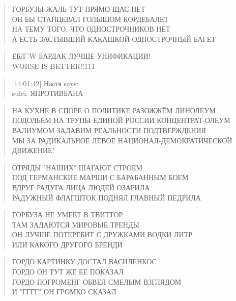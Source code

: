 \poemtitle{***}
\begin{verse}
ГОРБУЗЫ ЖАЛЬ ТУТ ПРЯМО ЩАС НЕТ\\
ОН БЫ СТАНЦЕВАЛ ГОЛЫШОМ КОРДЕБАЛЕТ\\
НА ТЕМУ ТОГО, ЧТО ОДНОСТРОЧНИКОВ НЕТ\\
А ЕСТЬ ЗАСТЫВШИЙ КАКАШКОЙ ОДНОСТРОЧНЫЙ БАГЕТ
\end{verse}

\poemtitle{***}
\begin{verse}
ЕБЛ^W БАРДАК ЛУЧШЕ УНИФИКАЦИИ!\\
WORSE IS BETTER!!111
\end{verse}

\poemtitle{***}
\begin{verse}
[14:01:42] Наcтя says:\\
sulci: ЯПРОТИВБАНА
\end{verse}

\poemtitle{***}
\begin{verse}
НА КУХНЕ В СПОРЕ О ПОЛИТИКЕ РАЗОЖЖЁМ ЛИНОЛЕУМ\\
ПОДОЛЬЁМ НА ТРУПЫ ЕДИНОЙ РОССИИ КОНЦЕНТРАТ-ОЛЕУМ\\
ВАЛИУМОМ ЗАДАВИМ РЕАЛЬНОСТИ ПОДТВЕРЖДЕНИЯ\\
МЫ ЗА РАДИКАЛЬНОЕ ЛЕВОЕ НАЦИОНАЛ-ДЕМОКРАТИЧЕСКОЙ ДВИЖЕНИЕ!
\end{verse}

\poemtitle{***}
\begin{verse}
ОТРЯДЫ "НАШИХ" ШАГАЮТ СТРОЕМ\\
ПОД ГЕРМАНСКИЕ МАРШИ С БАРАБАННЫМ БОЕМ\\
ВДРУГ РАДУГА ЛИЦА ЛЮДЕЙ ОЗАРИЛА\\
РАДУЖНЫЙ ФЛАГШТОК ПОДНЯЛ ГЛАВНЫЙ ПЕДРИЛА
\end{verse}

\poemtitle{***}
\begin{verse}
ГОРБУЗА НЕ УМЕЕТ В ТВИТТОР\\
ТАМ ЗАДАЮТСЯ МИРОВЫЕ ТРЕНДЫ\\
ОН ЛУЧШЕ ПОТЕРЕБИТ С ДРУЖКАМИ ВОДКИ ЛИТР\\
ИЛИ КАКОГО ДРУГОГО БРЕНДИ
\end{verse}

\poemtitle{***}
\begin{verse}
ГОРДО КАРТИНКУ ДОСТАЛ ВАСИЛЕНКОС\\
ГОРДО ОН ТУТ ЖЕ ЕЕ ПОКАЗАЛ\\
ГОРДО ПОГРОМЕНГ ОБВЕЛ СМЕЛЫМ ВЗГЛЯДОМ\\
И "ГГГГ" ОН ГРОМКО СКАЗАЛ
\end{verse}

